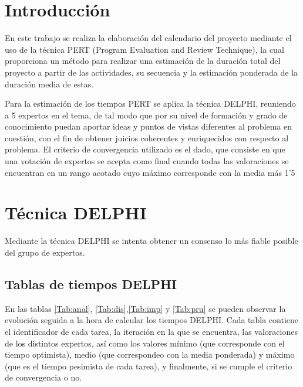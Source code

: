 \documentclass[11pt,a4paper,spanish,twoside]{report}
\begin{document}
\tableofcontents


\chapter*{Introducción}
En este trabajo se realiza la elaboración del calendario del proyecto
mediante el uso de la técnica PERT (Program Evaluation and Review Technique),
la cual proporciona un método para realizar una estimación de la duración
total del proyecto a partir de las actividades, su secuencia y la estimación
ponderada de la duración media de estas. 

Para la estimación de los tiempos PERT se aplica la técnica DELPHI, reuniendo
a 5 expertos en el tema, de tal modo que por su nivel de formación y grado de
conocimiento puedan aportar ideas y puntos de vistas diferentes al problema
en cuestión, con el fin de obtener juicios coherentes y enriquecidos con
respecto al problema. El criterio de convergencia utilizado es el dado, que
consiste en que una votación de expertos se acepta como final cuando todas
las valoraciones se encuentran en un rango acotado cuyo máximo corresponde
con la media más 1'5
\chapter{Técnica DELPHI}
Mediante la técnica DELPHI se intenta obtener un consenso lo más fiable
posible del grupo de expertos.
    
\section{Tablas de tiempos DELPHI}

En las tablas \ref{Tab:anal}, \ref{Tab:dis},\ref{Tab:imp} y \ref{Tab:pru}  se
pueden observar la evolución seguida a la hora de calcular los tiempos
DELPHI. Cada tabla contiene el identificador de cada tarea, la iteración en
la que se encuentra, las valoraciones de los distintos expertos, así como los
valores mínimo (que corresponde con el tiempo optimista), medio (que
correspondeo con la media ponderada) y máximo (que es el tiempo pesimista de
cada tarea), y finalmente, si se cumple el criterio de convergencia o no.
\end{document}
